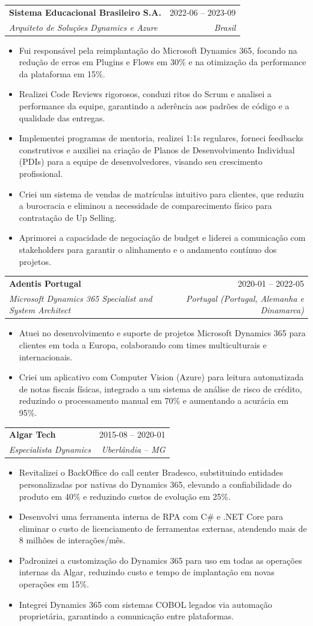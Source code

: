 \documentclass[a4paper,11pt]{article}
\makeatletter
\newcommand{\resumeItem}[1]{
  \item\small{
    {#1 \vspace{-2pt}}
  }
}
\newcommand{\resumeSubheading}[4]{
  \vspace{-1pt}\item
  \begin{tabular*}{0.97\textwidth}{l@{\extracolsep{\fill}}r}
    \textbf{#1} & #2 \\
    \textit{\small#3} & \textit{\small #4} \\
  \end{tabular*}\vspace{-5pt}
}
\newcommand{\resumeItemListStart}{\begin{itemize}}
\newcommand{\resumeItemListEnd}{\end{itemize}\vspace{-5pt}}
\makeatother
\begin{document}
\resumeSubheading
{Sistema Educacional Brasileiro S.A.}{2022-06 – 2023-09}
{Arquiteto de Soluções Dynamics e Azure}{Brasil}
\resumeItemListStart
\resumeItem{Fui responsável pela reimplantação do Microsoft Dynamics 365, focando na redução de erros em Plugins e Flows em 30\% e na otimização da performance da plataforma em 15\%.}
\resumeItem{Realizei Code Reviews rigorosos, conduzi ritos do Scrum e analisei a performance da equipe, garantindo a aderência aos padrões de código e a qualidade das entregas.}
\resumeItem{Implementei programas de mentoria, realizei 1:1s regulares, forneci feedbacks construtivos e auxiliei na criação de Planos de Desenvolvimento Individual (PDIs) para a equipe de desenvolvedores, visando seu crescimento profissional.}
\resumeItem{Criei um sistema de vendas de matrículas intuitivo para clientes, que reduziu a burocracia e eliminou a necessidade de comparecimento físico para contratação de Up Selling.}
\resumeItem{Aprimorei a capacidade de negociação de budget e liderei a comunicação com stakeholders para garantir o alinhamento e o andamento contínuo dos projetos.}
\resumeItemListEnd

\resumeSubheading
{Adentis Portugal}{2020-01 – 2022-05}
{Microsoft Dynamics 365 Specialist and System Architect}{Portugal (Portugal, Alemanha e Dinamarca)}
\resumeItemListStart
\resumeItem{Atuei no desenvolvimento e suporte de projetos Microsoft Dynamics 365 para clientes em toda a Europa, colaborando com times multiculturais e internacionais.}
\resumeItem{Criei um aplicativo com Computer Vision (Azure) para leitura automatizada de notas fiscais físicas, integrado a um sistema de análise de risco de crédito, reduzindo o processamento manual em 70\% e aumentando a acurácia em 95\%.}
\resumeItemListEnd

\resumeSubheading
{Algar Tech}{2015-08 – 2020-01}
{Especialista Dynamics}{Uberlândia – MG}
\resumeItemListStart
\resumeItem{Revitalizei o BackOffice do call center Bradesco, substituindo entidades personalizadas por nativas do Dynamics 365, elevando a confiabilidade do produto em 40\% e reduzindo custos de evolução em 25\%.}
\resumeItem{Desenvolvi uma ferramenta interna de RPA com C\# e .NET Core para eliminar o custo de licenciamento de ferramentas externas, atendendo mais de 8 milhões de interações/mês.}
\resumeItem{Padronizei a customização do Dynamics 365 para uso em todas as operações internas da Algar, reduzindo custo e tempo de implantação em novas operações em 15\%.}
\resumeItem{Integrei Dynamics 365 com sistemas COBOL legados via automação proprietária, garantindo a comunicação entre plataformas.}
\resumeItemListEnd
\end{document}
